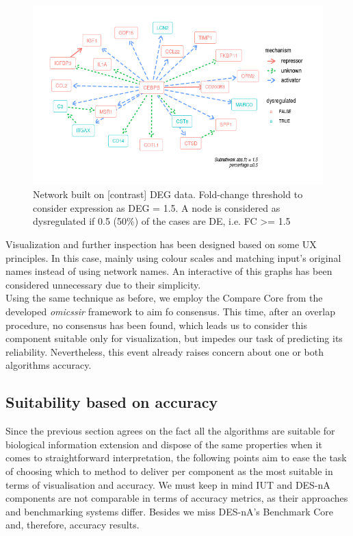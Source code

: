 \begin{figure}
    \centering
    \includegraphics[width=\textwidth]{Major Thesis/figures/desna/desna-network.png}
    \caption{Network built on [contrast] DEG data. Fold-change threshold to consider expression as DEG = 1.5. A node is considered as dysregulated if 0.5 (50\%) of the cases are DE, i.e. FC >= 1.5}
    \label{fig:desna-network}
\end{figure}

Visualization and further inspection has been designed based on some UX principles. In this case, mainly using colour scales and matching input’s original names instead of using network names. An interactive of this graphs has been considered unnecessary due to their simplicity.
\\

Using the same technique as before, we employ the Compare Core from the developed \textit{omicssir} framework to aim fo consensus. This time, after an overlap procedure, no consensus has been found, which leads us to consider this component suitable only for visualization, but impedes our task of predicting its reliability. Nevertheless, this event already raises concern about one or both algorithms accuracy.

\subsection{Suitability based on accuracy}
Since the previous section agrees on the fact all the algorithms are suitable for biological information extension and dispose of the same properties when it comes to straightforward interpretation, the following points aim to ease the task of choosing which to method to deliver per component as the most suitable in terms of visualisation and accuracy.
We must keep in mind IUT and DES-nA components are not comparable in terms of accuracy metrics, as their approaches and benchmarking systems differ. Besides we miss DES-nA’s Benchmark Core and, therefore, accuracy results.

